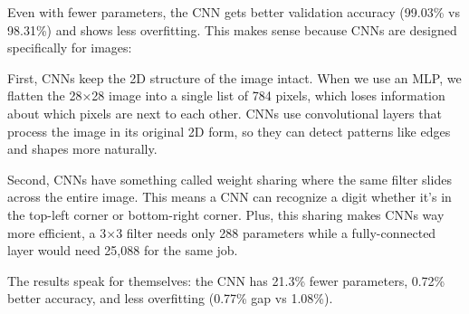 Even with fewer parameters, the CNN gets better validation accuracy (99.03\% vs 98.31\%) and shows less overfitting. This makes sense because CNNs are designed specifically for images:

First, CNNs keep the 2D structure of the image intact. When we use an MLP, we flatten the 28×28 image into a single list of 784 pixels, which loses information about which pixels are next to each other. CNNs use convolutional layers that process the image in its original 2D form, so they can detect patterns like edges and shapes more naturally. 

Second, CNNs have something called weight sharing where the same filter slides across the entire image. This means a CNN can recognize a digit whether it's in the top-left corner or bottom-right corner. Plus, this sharing makes CNNs way more efficient, a 3×3 filter needs only 288 parameters while a fully-connected layer would need 25,088 for the same job.

The results speak for themselves: the CNN has 21.3\% fewer parameters, 0.72\% better accuracy, and less overfitting (0.77\% gap vs 1.08\%).
